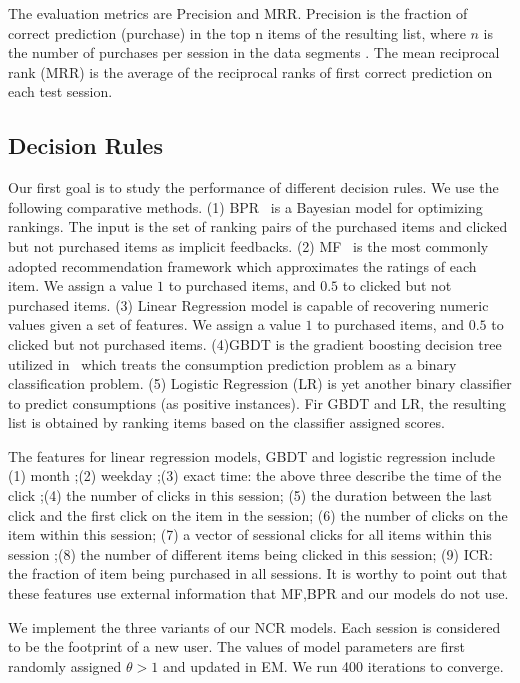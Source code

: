 \documentclass[sigconf]{acmart}
\begin{document}
The evaluation metrics are Precision and MRR. Precision is the fraction of correct prediction (purchase) in the top n items of the resulting list, where $n$ is the number of purchases per session in the data segments . The mean reciprocal rank (MRR) is the average of the reciprocal ranks of first correct prediction on each test session.

\subsection{Decision Rules}
Our first goal is to study the performance of different decision rules. We use the following comparative methods. (1) BPR~\cite{Rendle2009BPR} is a Bayesian model for optimizing rankings. The input is the set of ranking pairs of the purchased items  and clicked but not purchased items as implicit feedbacks. (2) MF~\cite{Koren2009Matrix} is the most commonly adopted recommendation framework which approximates the ratings of each item. We assign a value $1$ to purchased items, and $0.5$ to clicked but not purchased items. (3) Linear Regression model is capable of recovering numeric values given a set of features. We assign a value $1$ to purchased items, and $0.5$ to clicked but not purchased items. (4)GBDT is the  gradient boosting decision tree utilized in~\cite{Yan2015E} which treats the consumption prediction problem as a binary classification problem. (5) Logistic Regression (LR) is yet another binary classifier to predict consumptions (as positive instances). Fir GBDT and LR, the resulting list is obtained by ranking items based on the classifier assigned scores. 

The features for linear regression models, GBDT and logistic regression include (1) month ;(2) weekday ;(3) exact time: the above three describe the time of the click ;(4) the number of clicks in this session; (5) the duration between the last click and the first click on the item in the session; (6) the number of clicks on the item within this session; (7) a vector of sessional clicks for all items within this session ;(8) the number of different items being clicked in this session; (9) ICR: the fraction of item being purchased in all sessions. It is worthy to point out that these features use external information that MF,BPR and our models do not use.

We implement the three variants of our NCR models. Each session is considered to be the footprint of a new user.  The values of model parameters are first randomly assigned $\theta>1$ and updated in EM. We run 400 iterations to converge.
\end{document}
